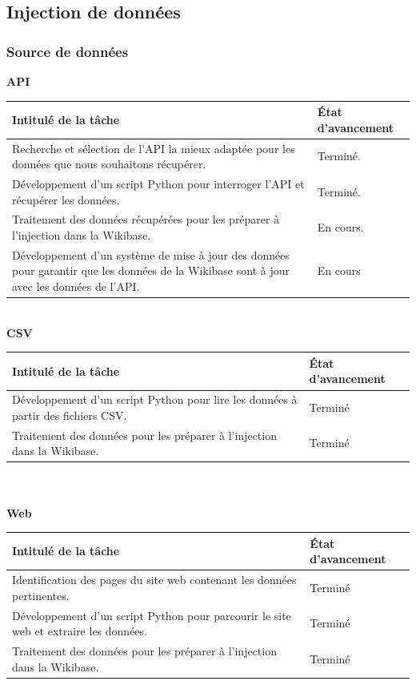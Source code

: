 \documentclass[a4paper, 12pt]{article}
\begin{document}
\subsection{Injection de données}


\subsubsection{Source de données}
\textbf{API}

\begin{tabular}{|p{14cm}|p{3cm}|}
\hline
\rowcolor[HTML]{EFEFEF}
Intitulé de la tâche & État d'avancement \\
\hline Recherche et sélection de l'API la mieux adaptée pour les données que nous souhaitons récupérer. & Terminé. \\
\hline Développement d'un script Python pour interroger l'API et récupérer les données. & Terminé. \\
\hline Traitement des données récupérées pour les préparer à l'injection dans la Wikibase. & En cours.\\
\hline Développement d'un système de mise à jour des données pour garantir que les données de la Wikibase sont à jour avec les données de l'API. & En cours\\
\hline
\end{tabular}
\\

\textbf{CSV}

\begin{tabular}{|p{14cm}|p{3cm}|}
\hline
\rowcolor[HTML]{EFEFEF}
Intitulé de la tâche & État d'avancement \\
\hline Développement d'un script Python pour lire les données à partir des fichiers CSV. & Terminé \\
\hline Traitement des données pour les préparer à l'injection dans la Wikibase. & Terminé \\
\hline
\end{tabular}
\\\\

\textbf{Web}

\begin{tabular}{|p{14cm}|p{3cm}|}
\hline
\rowcolor[HTML]{EFEFEF}
Intitulé de la tâche & État d'avancement \\
\hline Identification des pages du site web contenant les données pertinentes. & Terminé \\
\hline Développement d'un script Python pour parcourir le site web et extraire les données. & Terminé \\
\hline Traitement des données pour les préparer à l'injection dans la Wikibase. & Terminé \\

\hline
\end{tabular}
\end{document}
